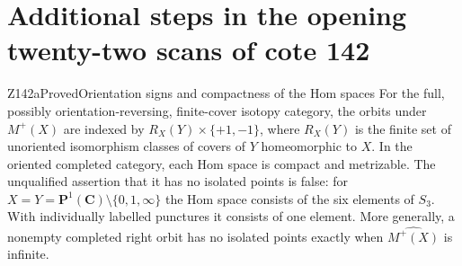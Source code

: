 \section{Additional steps in the opening twenty-two scans of cote 142}
\label{sec:Z142}

\begin{result}{Z142a}{Proved}{Orientation signs and compactness of the Hom spaces}
For the full, possibly orientation-reversing, finite-cover isotopy
category, the orbits under $M^+(X)$ are indexed by
$R_X(Y)\times\{+1,-1\}$, where $R_X(Y)$ is the finite set of
unoriented isomorphism classes of covers of $Y$ homeomorphic to $X$.
In the oriented completed category, each Hom space is compact and
metrizable. The unqualified assertion that it has no isolated points
is false: for $X=Y=\mathbf P^1(\mathbf C)\setminus\{0,1,\infty\}$
the Hom space consists of the six elements of $S_3$. With individually
labelled punctures it consists of one element. More generally, a
nonempty completed right orbit has no isolated points exactly when
$\widehat{M^+(X)}$ is infinite.
\end{result}
